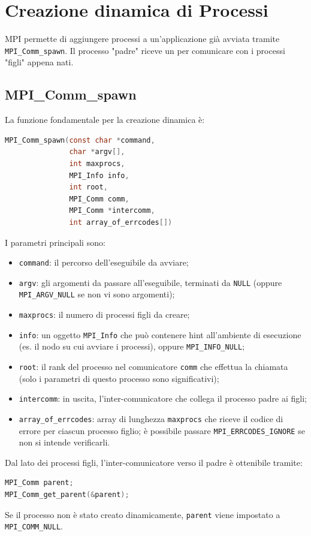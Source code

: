 \section{Creazione dinamica di Processi} 
MPI permette di aggiungere processi a un'applicazione già avviata tramite \texttt{MPI\_Comm\_spawn}. Il processo "padre" riceve un  per comunicare con i processi "figli" appena nati.

\subsection{MPI\_Comm\_spawn}
La funzione fondamentale per la creazione dinamica è:
\begin{lstlisting}[language=C, numbers=none]
MPI_Comm_spawn(const char *command,
               char *argv[],
               int maxprocs,
               MPI_Info info,
               int root,
               MPI_Comm comm,
               MPI_Comm *intercomm,
               int array_of_errcodes[])
\end{lstlisting}
I parametri principali sono:
\begin{itemize}
    \item \texttt{command}: il percorso dell'eseguibile da avviare;
    \item \texttt{argv}: gli argomenti da passare all'eseguibile, terminati da \texttt{NULL} (oppure \texttt{MPI\_ARGV\_NULL} se non vi sono argomenti);
    \item \texttt{maxprocs}: il numero di processi figli da creare;
    \item \texttt{info}: un oggetto \texttt{MPI\_Info} che può contenere hint all'ambiente di esecuzione (es. il nodo su cui avviare i processi), oppure \texttt{MPI\_INFO\_NULL};
    \item \texttt{root}: il rank del processo nel comunicatore \texttt{comm} che effettua la chiamata (solo i parametri di questo processo sono significativi);
    \item \texttt{intercomm}: in uscita, l'inter-comunicatore che collega il processo padre ai figli;
    \item \texttt{array\_of\_errcodes}: array di lunghezza \texttt{maxprocs} che riceve il codice di errore per ciascun processo figlio; è possibile passare \texttt{MPI\_ERRCODES\_IGNORE} se non si intende verificarli.
\end{itemize}

Dal lato dei processi figli, l'inter-comunicatore verso il padre è ottenibile tramite:
\begin{lstlisting}[language=C, numbers=none]
MPI_Comm parent;
MPI_Comm_get_parent(&parent);
\end{lstlisting}
Se il processo non è stato creato dinamicamente, \texttt{parent} viene impostato a \texttt{MPI\_COMM\_NULL}.

